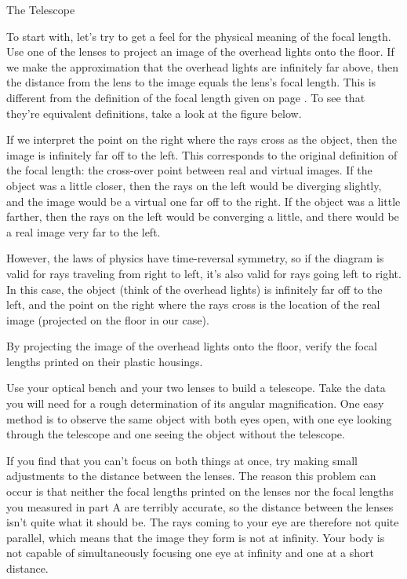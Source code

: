 \begin{lab}{The Telescope}
\labobservations


To start with, let's try to get a feel for the physical meaning
of the focal length. Use one of the lenses to project an image
of the overhead lights onto the floor. If we make the approximation
that the overhead lights are infinitely far above, then the distance
from the lens to the image equals the lens's focal length.\label{alt-focal-length-definition}
This is different from the definition of the focal length given on page
\pageref{focal-length-definition}. To see that they're equivalent definitions,
take a look at the figure below.


If we interpret the point on the right where the rays cross as the object, then the
image is infinitely far off to the left. This corresponds to the original definition
of the focal length: the cross-over point between real and virtual images.
If the object was a little closer, then the rays on the left would be diverging slightly,
and the image would be a virtual one far off to the right. If the object was a little farther,
then the rays on the left would be converging a little, and there would be a real image
very far to the left.

However, the laws of physics have time-reversal symmetry, so if the diagram is valid for
rays traveling from right to left, it's also valid for rays going left to right. In this
case, the object (think of the overhead lights) is infinitely far off to the left,
and the point on the right where the rays cross is the location of the real image
(projected on the floor in our case).

By projecting the image of the overhead lights onto the floor, verify the
focal lengths printed on their plastic housings.


Use your optical bench and your two lenses to build a
telescope. Take the data you will need for a rough
determination of its angular magnification. One easy method
is to observe the same object with both eyes open, with one
eye looking through the telescope and one seeing the object
without the telescope.

If you find that you can't focus on both things at once,
try making small adjustments to the distance between the
lenses. The reason this problem can occur is that neither
the focal lengths printed on the lenses nor the focal
lengths you measured in part A are terribly accurate,
so the distance between the lenses isn't quite what it
should be. The rays coming to your eye are therefore not
quite parallel, which means that the image they form is
not at infinity. Your body is not capable of simultaneously 
focusing one eye at infinity and one at a short distance.
\end{lab}

